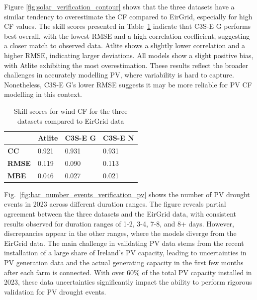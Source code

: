 \documentclass[a4paper, 11pt]{article}
\begin{document}
Figure \ref{fig:solar_verification_contour} shows that the three datasets have a similar tendency to overestimate the CF compared to EirGrid, especially for high CF values. The skill scores presented in Table~\ref{tab:pv_skill_scores} indicate that C3S-E G performs best overall, with the lowest RMSE and a high correlation coefficient, suggesting a closer match to observed data. Atlite shows a slightly lower correlation and a higher RMSE, indicating larger deviations. All models show a slight positive bias, with Atlite exhibiting the most overestimation. These results reflect the broader challenges in accurately modelling PV, where variability is hard to capture. Nonetheless, C3S-E G’s lower RMSE suggests it may be more reliable for PV CF modelling in this context.

\begin{table}[!ht]
	\centering
	\begin{tabular}{l|lll|}
	\cline{2-4}
	& \textbf{Atlite} & \textbf{C3S-E G} & \textbf{C3S-E N} \\ \hline
	\multicolumn{1}{|l|}{\textbf{CC}}   & 0.921           & 0.931            & 0.931            \\ \hline
	\multicolumn{1}{|l|}{\textbf{RMSE}} & 0.119           & 0.090            & 0.113            \\ \hline
	\multicolumn{1}{|l|}{\textbf{MBE}}   & 0.046           & 0.027           & 0.021           \\ \hline
	\end{tabular}
	\caption{Skill scores for wind CF for the three datasets compared to EirGrid data}
	\label{tab:pv_skill_scores}
\end{table}

Fig.~\ref{fig:bar_number_events_verification_pv} shows the number of PV drought events in 2023 across different duration ranges. The figure reveals partial agreement between the three datasets and the EirGrid data, with consistent results observed for duration ranges of 1-2, 3-4, 7-8, and 8+ days. However, discrepancies appear in the other ranges, where the models diverge from the EirGrid data. The main challenge in validating PV data stems from the recent installation of a large share of Ireland’s PV capacity, leading to uncertainties in PV generation data and the actual generating capacity in the first few months after each farm is connected. With over 60\% of the total PV capacity installed in 2023, these data uncertainties significantly impact the ability to perform rigorous validation for PV drought events.
\end{document}
